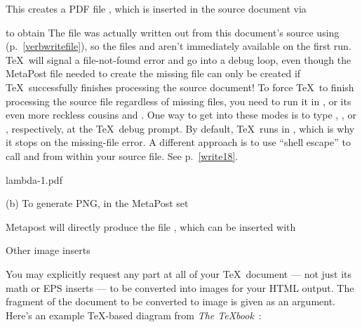 {{{{{{{{{{{{{{
This creates a PDF file , which is inserted in
the source document via

to obtain\f{%
%
The file
 was actually written out from this document’s
source using \p{\verbwrite} (p.~\ref{verbwritefile}),
so the files  and  aren’t immediately available
on the first run. \TeX\ will signal a file-not-found error and go
into a debug loop, even though the MetaPost file needed to create
the missing file can only be created if \TeX\ successfully
finishes processing the source document! To force \TeX\ to finish
processing the source file regardless of missing files, you need
to run it in
\p{\scrollmode}, or its even more reckless cousins
\p{\nonstopmode} and \p{\batchmode}.  One way to get into
these modes is to type , , or ,
respectively, at the \TeX\ debug prompt.  By default, \TeX\
runs in \p{\errorstopmode}, which is why it stops on
the missing-file error. A different approach is to use “shell
escape” to call  and  from within your
source file. See p.~\ref{write18}.}


\centerline{\XeTeXpdffile lambda-1.pdf }

(b) To generate PNG, in the MetaPost set

Metapost will directly produce the file , which
can be inserted with


\beginsection Other image inserts

%
%
You may explicitly request any part at all of your \TeX\
document — not just its math or EPS inserts —
to be converted into images for your HTML output.  The
fragment of the document to be converted to image is
given as an \p{\makehtmlimage} argument.
Here’s an example \TeX-based diagram from {\em
The \TeX book}~\cite[p~389]{texbook}:

}}}}}}}}}}}}}}
